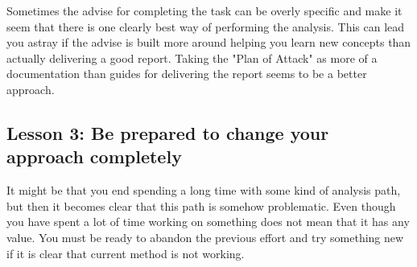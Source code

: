 \documentclass[12pt,a4paper,leqno]{report}
\theoremstyle{plain}
\theoremstyle{definition}
\theoremstyle{remark}
\begin{document}
Sometimes the advise for completing the task can be overly specific
and make it seem that there is one clearly best way of performing the analysis.
This can lead you astray if the advise is built more around helping you learn
new concepts than actually delivering a good report. Taking the "Plan of Attack" as
more of a documentation than guides for delivering the report seems to be a better
approach.

\subsection{Lesson 3: Be prepared to change your approach completely}

It might be that you end spending a long time with some kind of
analysis path, but then it becomes clear that this path is somehow problematic.
Even though you have spent a lot of time working on something does not mean
that it has any value. You must be ready to abandon the previous effort
and try something new if it is clear that current method is not working.
\end{document}
